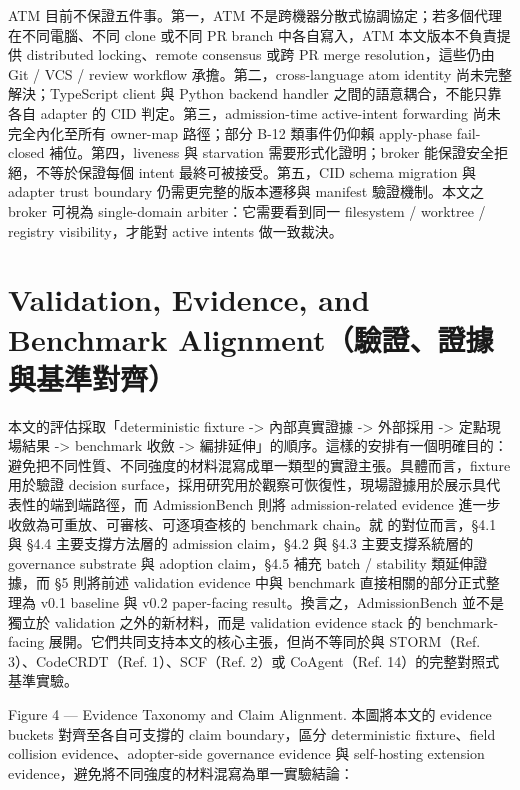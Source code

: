 \documentclass[a4paper,fontset=none]{ctexart}
\begin{document}
ATM 目前不保證五件事。第一，ATM 不是跨機器分散式協調協定；若多個代理在不同電腦、不同 clone 或不同 PR branch 中各自寫入，ATM 本文版本不負責提供 distributed locking、remote consensus 或跨 PR merge resolution，這些仍由 Git / VCS / review workflow 承擔。第二，cross-language atom identity 尚未完整解決；TypeScript client 與 Python backend handler 之間的語意耦合，不能只靠各自 adapter 的 CID 判定。第三，admission-time active-intent forwarding 尚未完全內化至所有 owner-map 路徑；部分 B-12 類事件仍仰賴 apply-phase fail-closed 補位。第四，liveness 與 starvation 需要形式化證明；broker 能保證安全拒絕，不等於保證每個 intent 最終可被接受。第五，CID schema migration 與 adapter trust boundary 仍需更完整的版本遷移與 manifest 驗證機制。本文之 broker 可視為 single-domain arbiter：它需要看到同一 filesystem / worktree / registry visibility，才能對 active intents 做一致裁決。

\medskip

\section{Validation, Evidence, and Benchmark Alignment（驗證、證據與基準對齊）}

本文的評估採取「deterministic fixture -> 內部真實證據 -> 外部採用 -> 定點現場結果 -> benchmark 收斂 -> 編排延伸」的順序。這樣的安排有一個明確目的：避免把不同性質、不同強度的材料混寫成單一類型的實證主張。具體而言，fixture 用於驗證 decision surface，採用研究用於觀察可恢復性，現場證據用於展示具代表性的端到端路徑，而 AdmissionBench 則將 admission-related evidence 進一步收斂為可重放、可審核、可逐項查核的 benchmark chain。就 \texttt{} 的對位而言，§4.1 與 §4.4 主要支撐方法層的 admission claim，§4.2 與 §4.3 主要支撐系統層的 governance substrate 與 adoption claim，§4.5 補充 batch / stability 類延伸證據，而 §5 則將前述 validation evidence 中與 benchmark 直接相關的部分正式整理為 v0.1 baseline 與 v0.2 paper-facing result。換言之，AdmissionBench 並不是獨立於 validation 之外的新材料，而是 validation evidence stack 的 benchmark-facing 展開。它們共同支持本文的核心主張，但尚不等同於與 STORM（Ref. 3）、CodeCRDT（Ref. 1）、SCF（Ref. 2）或 CoAgent（Ref. 14）的完整對照式基準實驗。

Figure 4 --- Evidence Taxonomy and Claim Alignment. 本圖將本文的 evidence buckets 對齊至各自可支撐的 claim boundary，區分 deterministic fixture、field collision evidence、adopter-side governance evidence 與 self-hosting extension evidence，避免將不同強度的材料混寫為單一實驗結論：
\end{document}
